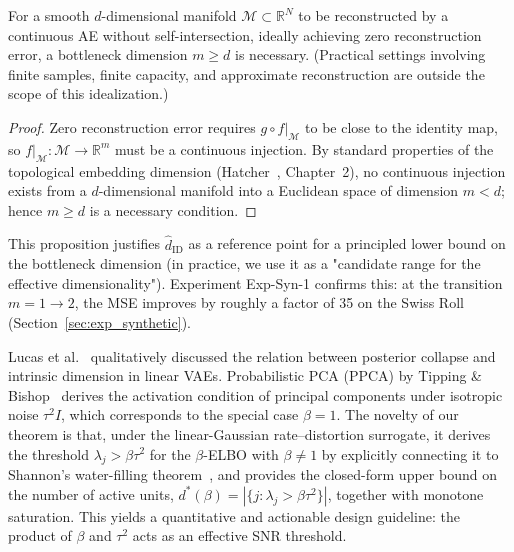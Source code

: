 \documentclass[make,article,submit,pdftex,moreauthors]{Definitions/mdpi}
\newcommand{\R}{\mathbb{R}}
\begin{document}
\begin{Proposition}\label{thm:lower_bound}
For a smooth $d$-dimensional manifold $\mathcal{M} \subset \R^N$ to be reconstructed by
a continuous AE without self-intersection, ideally achieving zero reconstruction error,
a bottleneck dimension $m \geq d$ is necessary.
(Practical settings involving finite samples, finite capacity, and approximate
reconstruction are outside the scope of this idealization.)
\end{Proposition}

\begin{proof}
Zero reconstruction error requires $g \circ f|_\mathcal{M}$ to be close to the identity map,
so $f|_\mathcal{M}: \mathcal{M} \to \R^m$ must be a continuous injection.
By standard properties of the topological embedding dimension
(Hatcher~\cite{hatcher2002algebraic}, Chapter~2), no continuous injection exists from a
$d$-dimensional manifold into a Euclidean space of dimension $m < d$;
hence $m \geq d$ is a necessary condition.
\end{proof}

This proposition justifies $\hat{d}_\mathrm{ID}$ as a reference point for a principled
lower bound on the bottleneck dimension
(in practice, we use it as a "candidate range for the effective dimensionality").
Experiment Exp-Syn-1 confirms this: at the transition $m = 1 \to 2$, the MSE improves by
roughly a factor of 35 on the Swiss Roll (Section~\ref{sec:exp_synthetic}).

\begin{Remark}
Lucas et al.~\cite{lucas2019elbo} qualitatively discussed the relation between posterior
collapse and intrinsic dimension in linear VAEs.
Probabilistic PCA (PPCA) by Tipping \& Bishop~\cite{tippingbishop1999ppca} derives the
activation condition of principal components under isotropic noise $\tau^2 I$,
which corresponds to the special case $\beta = 1$.
The novelty of our theorem is that, under the linear-Gaussian rate--distortion surrogate,
it derives the threshold $\lambda_j > \beta\tau^2$ for the $\beta$-ELBO with
$\beta \neq 1$ by explicitly connecting it to Shannon's water-filling
theorem~\cite{cover2006elements}, and provides the closed-form upper bound on the number
of active units, $d^*(\beta) = |\{j:\lambda_j > \beta\tau^2\}|$, together with monotone
saturation.
This yields a quantitative and actionable design guideline: the product of $\beta$ and
$\tau^2$ acts as an effective SNR threshold.
\end{Remark}
\end{document}
